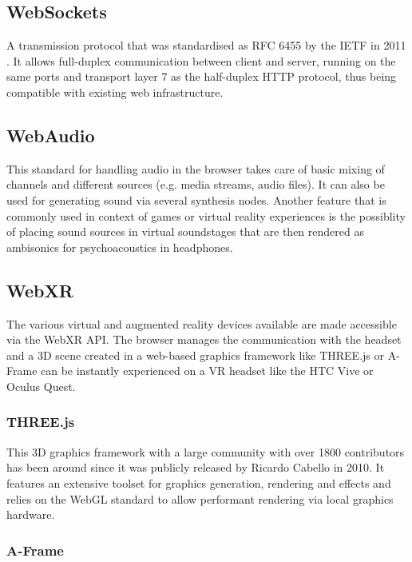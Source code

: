 \subsection{WebSockets}

A transmission protocol that was standardised as \ac{RFC} 6455 by the \ac{IETF} in 2011 \parencite{webSocketsProtocolRfc}. It allows full-duplex communication between client and server, running on the same ports and transport layer 7 as the half-duplex \ac{HTTP} protocol, thus being compatible with existing web infrastructure.

\subsection{WebAudio}

This standard for handling audio in the browser takes care of basic mixing of channels and different sources (e.g. media streams, audio files). It can also be used for generating sound via several synthesis nodes. Another feature that is commonly used in context of games or virtual reality experiences is the possiblity of placing sound sources in virtual soundstages that are then rendered as ambisonics for psychoacoustics in headphones.

\subsection{WebXR}

The various virtual and augmented reality devices available are made accessible via the WebXR \ac{API}. The browser manages the communication with the headset and a \ac{3D} scene created in a web-based graphics framework like THREE.js or A-Frame can be instantly experienced on a \ac{VR} headset like the HTC Vive or Oculus Quest.

\subsubsection{THREE.js}

This \ac{3D} graphics framework with a large community with over 1800 contributors has been around since it was publicly released by Ricardo Cabello in 2010. It features an extensive toolset for graphics generation, rendering and effects and relies on the WebGL standard to allow performant rendering via local graphics hardware.

\subsubsection{A-Frame}

